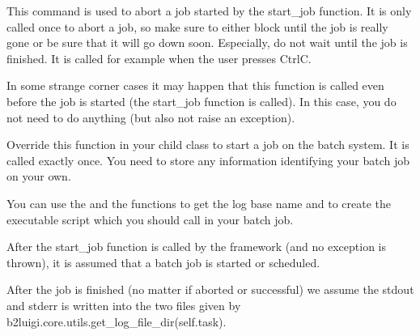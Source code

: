 \documentclass[letterpaper,10pt,english]{sphinxmanual}
\begin{document}
\begin{fulllineitems}

\begin{fulllineitems}
\label{\detokenize{usage/batch:b2luigi.batch.processes.BatchProcess.kill_job}}
This command is used to abort a job started by the start\_job function.
It is only called once to abort a job, so make sure to either block until the job is really
gone or be sure that it will go down soon. Especially, do not wait until the job is finished.
It is called for example when the user presses Ctrl\sphinxhyphen{}C.

In some strange corner cases it may happen that this function is called even before the
job is started (the start\_job function is called). In this case, you do not need to do anything
(but also not raise an exception).

\end{fulllineitems}


\begin{fulllineitems}
\label{\detokenize{usage/batch:b2luigi.batch.processes.BatchProcess.start_job}}
Override this function in your child class to start a job on the batch system.
It is called exactly once. You need to store any information identifying
your batch job on your own.

You can use the  and the
 functions to get the log base name
and to create the executable script which you should call in your batch job.

After the start\_job function is called by the framework (and no exception is thrown),
it is assumed that a batch job is started or scheduled.

After the job is finished (no matter if aborted or successful) we assume the stdout and stderr
is written into the two files given by b2luigi.core.utils.get\_log\_file\_dir(self.task).

\end{fulllineitems}


\end{fulllineitems}
\end{document}
